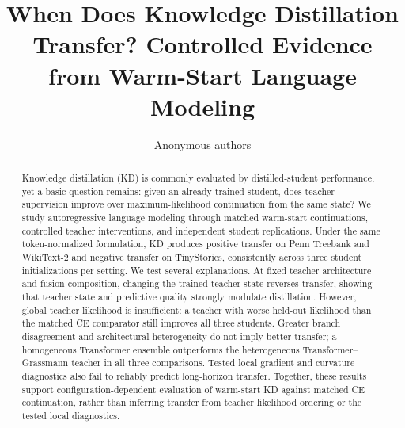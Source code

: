 \documentclass[11pt]{article}
\title{When Does Knowledge Distillation Transfer? Controlled Evidence from Warm-Start Language Modeling}
\author{Anonymous authors}
\begin{document}
\maketitle
\begin{abstract}
Knowledge distillation (KD) is commonly evaluated by distilled-student performance, yet a basic question remains: given an already trained student, does teacher supervision improve over maximum-likelihood continuation from the same state? We study autoregressive language modeling through matched warm-start continuations, controlled teacher interventions, and independent student replications. Under the same token-normalized formulation, KD produces positive transfer on Penn Treebank and WikiText-2 and negative transfer on TinyStories, consistently across three student initializations per setting. We test several explanations. At fixed teacher architecture and fusion composition, changing the trained teacher state reverses transfer, showing that teacher state and predictive quality strongly modulate distillation. However, global teacher likelihood is insufficient: a teacher with worse held-out likelihood than the matched CE comparator still improves all three students. Greater branch disagreement and architectural heterogeneity do not imply better transfer; a homogeneous Transformer ensemble outperforms the heterogeneous Transformer--Grassmann teacher in all three comparisons. Tested local gradient and curvature diagnostics also fail to reliably predict long-horizon transfer. Together, these results support configuration-dependent evaluation of warm-start KD against matched CE continuation, rather than inferring transfer from teacher likelihood ordering or the tested local diagnostics.
\end{abstract}













\clearpage
\appendix
\setcounter{figure}{0}
\renewcommand{\thefigure}{A\arabic{figure}}
\renewcommand{\theHfigure}{appendix.\arabic{figure}}




\end{document}
